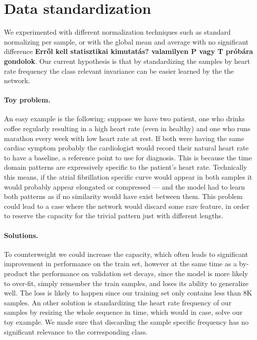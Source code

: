 \section{Data standardization}
We experimented with different normalization techniques such as standard normalizing per sample, or with the global mean and average with no significant difference \textbf{Erről kell statisztikai kimutatás? valamilyen P vagy T próbára gondolok}.
Our current hypothesis is that by standardizing the samples by heart rate frequency the class relevant invariance can be easier learned by the the network.
\paragraph{Toy problem.}
An easy example is the following: suppose we have two patient, one who drinks coffee regularly resulting in a high heart rate (even in healthy) and one who runs marathon every week with low heart rate at rest.
If both were having the same cardiac symptom probably the cardiologist would record their natural heart rate to have a baseline, a reference point to use for diagnosis.
This is because the time domain patterns are expressively specific to the patient's heart rate.
Technically this means, if the atrial fibrillation specific curve would appear in both samples it would probably appear elongated or compressed --- and the model had to learn both patterns as if no similarity would have exist between them.
This problem could lead to a case where the network would discard some rare feature, in order to reserve the capacity for the trivial pattern just with different lengths.
\cite{Figure Same pattern different frequency}
\paragraph{Solutions.}
To counterweight we could increase the capacity, which often leads to significant improvement in performance on the train set, however at the same time as a by-product the performance on validation set decays, since the model is more likely to over-fit, simply remember the train samples, and loses its ability to generalize well.
The loss is likely to happen since our training set only contains less than 8K samples.
An other solution is standardizing the heart rate frequency of our samples by resizing the whole sequence in time, which would in case, solve our toy example.
We made sure that discarding the sample specific frequency has no significant relevance to the corresponding class.
\cite{2D histogram, violin plot? attractive :)}

